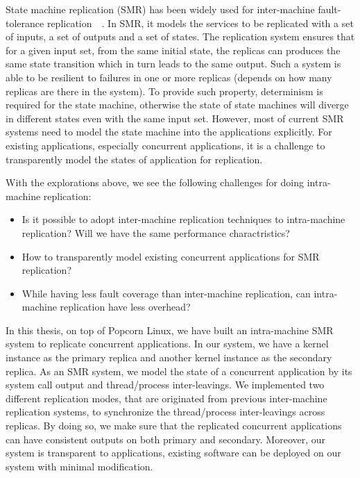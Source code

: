 State machine replication (SMR) has been widely used for inter-machine fault-tolerance replication~\cite{schneider1990implementing}~\cite{lamport1978time}. In SMR, it models the services to be replicated with a set of inputs, a set of outputs and a set of states. The replication system ensures that for a given input set, from the same initial state, the replicas can produces the same state transition which in turn leads to the same output. Such a system is able to be resilient to failures in one or more replicas (depends on how many replicas are there in the system). To provide such property, determinism is required for the state machine, otherwise the state of state machines will diverge in different states even with the same input set. However, most of current SMR systems need to model the state machine into the applications explicitly. For existing applications, especially concurrent applications, it is a challenge to transparently model the states of application for replication.

With the explorations above, we see the following challenges for doing intra-machine replication:
\begin{itemize}
\item Is it possible to adopt inter-machine replication techniques to intra-machine replication? Will we have the same performance charactristics?
\item How to transparently model existing concurrent applications for SMR replication?
\item While having less fault coverage than inter-machine replication, can intra-machine replication have less overhead?
\end{itemize}

In this thesis, on top of Popcorn Linux, we have built an intra-machine SMR system to replicate concurrent applications. In our system, we have a kernel instance as the primary replica and another kernel instance as the secondary replica. As an SMR system, we model the state of a concurrent application by its system call output and thread/process inter-leavings. We implemented two different replication modes, that are originated from previous inter-machine replication systems, to synchronize the thread/process inter-leavings across replicas. By doing so, we make sure that the replicated concurrent applications can have consistent outputs on both primary and secondary. Moreover, our system is transparent to applications, existing software can be deployed on our system with minimal modification.

